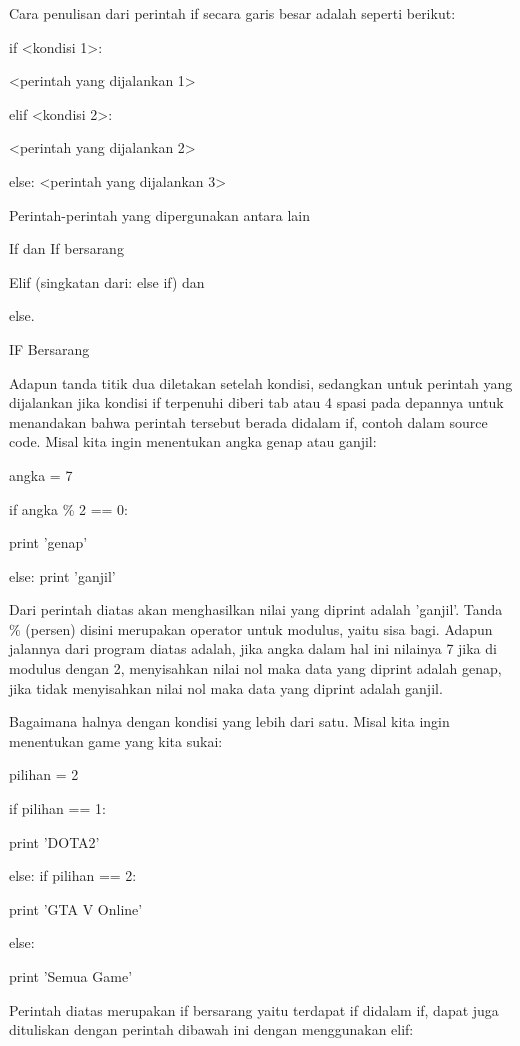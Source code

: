 Cara penulisan dari perintah if secara garis besar adalah seperti berikut: 
 


if <kondisi 1>: 
 

   <perintah yang dijalankan 1> 
 

elif <kondisi 2>: 
 

<perintah yang dijalankan 2> 
 

else:
   <perintah yang dijalankan 3> 
 


Perintah-perintah yang dipergunakan antara lain 
 

If dan If bersarang 
 

Elif (singkatan dari: else if) dan 
 

else.
 
 

IF Bersarang 
 

Adapun tanda titik dua diletakan setelah kondisi, sedangkan untuk perintah yang dijalankan jika kondisi if terpenuhi diberi tab atau 4 spasi pada depannya untuk menandakan bahwa perintah tersebut berada didalam if, contoh dalam source code. Misal kita ingin menentukan angka genap atau ganjil: 
 

angka = 7 
 

if angka    \%   2 == 0: 
 

        print 'genap' 
 

else:
   print 'ganjil' 
 

 Dari perintah diatas akan menghasilkan nilai yang diprint adalah 'ganjil'. Tanda  $  \%  $ (persen) disini merupakan operator untuk modulus, yaitu sisa bagi. Adapun jalannya dari program diatas adalah, jika angka dalam hal ini nilainya 7 jika di modulus dengan 2, menyisahkan nilai nol maka data yang diprint adalah genap, jika tidak menyisahkan nilai nol maka data yang diprint adalah ganjil. 
 

Bagaimana halnya dengan kondisi yang lebih dari satu. Misal kita ingin menentukan game yang kita sukai: 
 

pilihan = 2 
 

if pilihan == 1: 
 

        print 'DOTA2' 
 

else:
        if pilihan == 2: 
 

                print 'GTA V Online' 
 

        else: 
 

                print 'Semua Game' 
 

Perintah diatas merupakan if bersarang yaitu terdapat if didalam if, dapat juga dituliskan dengan perintah dibawah ini dengan menggunakan elif: 
 


